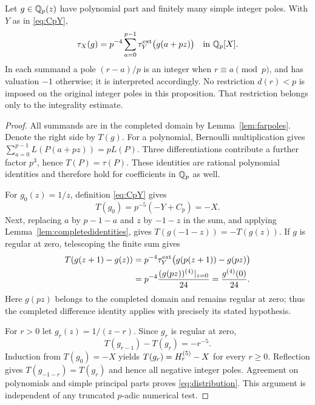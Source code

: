 \begin{proposition}
\label{prop:distribution}
Let $g\in\mathbb Q_p(z)$ have polynomial part and finitely many simple integer
poles. With $Y$ as in \eqref{eq:CpY},
\begin{equation}\label{eq:distribution}
 \tau_X(g)=p^{-4}\sum_{a=0}^{p-1}\tau^{\mathrm{ext}}_Y\bigl(g(a+pz)\bigr)
 \quad\text{in }\mathbb Q_p[X].
\end{equation}
In each summand a pole $(r-a)/p$ is an integer when $r\equiv a\pmod p$,
and has valuation $-1$ otherwise; it is interpreted accordingly. No
restriction $d(r)<p$ is imposed on the original integer poles in this
proposition. That restriction belongs only to the integrality estimate.
\end{proposition}
\begin{proof}
All summands are in the completed domain by
Lemma~\ref{lem:farpoles}. Denote the right side by $T(g)$.
For a polynomial, Bernoulli multiplication gives
$\sum_{a=0}^{p-1}L(P(a+pz))=pL(P)$.
Three differentiations contribute a further factor $p^3$, hence
$T(P)=\tau(P)$. These identities are rational polynomial identities and
therefore hold for coefficients in $\mathbb Q_p$ as well.

For $g_0(z)=1/z$, definition \eqref{eq:CpY} gives
\[
 T(g_0)=p^{-5}(-Y+C_p)=-X.
\]
Next, replacing $a$ by $p-1-a$ and $z$ by $-1-z$ in the sum, and applying
Lemma~\ref{lem:completedidentities}, gives
$T(g(-1-z))=-T(g(z))$. If $g$ is regular at zero, telescoping the finite
sum gives
\begin{align*}
 T(g(z+1)-g(z))
 &=p^{-4}\tau^{\mathrm{ext}}_Y\bigl(g(p(z+1))-g(pz)\bigr)\\
 &=p^{-4}\frac{(g(pz))^{(4)}|_{z=0}}{24}
 =\frac{g^{(4)}(0)}{24}.
\end{align*}
Here $g(pz)$ belongs to the completed domain and remains regular at zero;
thus the completed difference identity applies with precisely its stated
hypothesis.

For $r>0$ let $g_r(z)=1/(z-r)$. Since $g_r$ is regular at zero,
\[
 T(g_{r-1})-T(g_r)=-r^{-5}.
\]
Induction from $T(g_0)=-X$ yields $T(g_r)=H^{(5)}_{r}-X$ for every $r\ge0$.
Reflection gives $T(g_{-1-r})=T(g_r)$ and hence all negative integer
poles. Agreement on polynomials and simple principal parts proves
\eqref{eq:distribution}. This argument is independent of any truncated
$p$-adic numerical test.
\end{proof}


